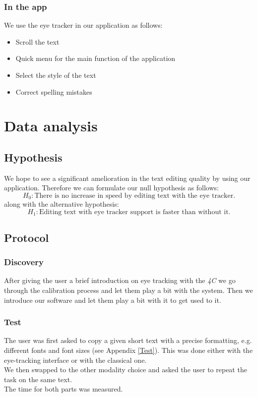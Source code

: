 \documentclass[12pt, a4paper]{article}
\begin{document}
\subsubsection{In the app}
We use the eye tracker in our application as follows:
\begin{itemize}
\item Scroll the text
\item Quick menu for the main function of the application
\item Select the style of the text
\item Correct spelling mistakes
\end{itemize}

\section{Data analysis}

\subsection{Hypothesis}
We hope to see a significant amelioration in the text editing quality by using our application. Therefore we can formulate our null hypothesis as follows: 
\[H_0: \text{There is no increase in speed by editing text with the eye tracker.}\] 
along with the alternative hypothesis: 
\[H_1: \text{Editing text with eye tracker support is faster than without it.}\]

\subsection{Protocol}

\subsubsection{Discovery}
After giving the user a brief introduction on eye tracking with the \textit{4C} we go through the calibration process and let them play a bit with the system. Then we introduce our software and let them play a bit with it to get used to it.

\subsubsection{Test}
The user was first asked to copy a given short text with a precise formatting, e.g. different fonts and font sizes (see Appendix \ref{Test}). This was done either with the eye-tracking interface or with the classical one. \\
We then swapped to the other modality choice and asked the user to repeat the task on the same text. \\
The time for both parts was measured. 
\end{document}
